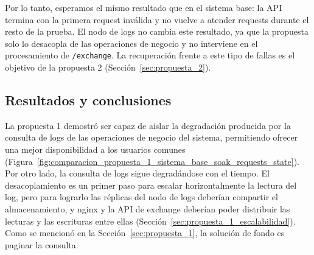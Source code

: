     Por lo tanto, esperamos el mismo resultado que en el sistema base: la API termina con la primera request inválida y no
    vuelve a atender requests durante el resto de la prueba. El nodo de logs no cambia este resultado, ya que la
    propuesta solo lo desacopla de las operaciones de negocio y no interviene en el procesamiento de \texttt{/exchange}.
    La recuperación frente a este tipo de fallas es el objetivo de la propuesta 2 (Sección~\ref{sec:propuesta_2}).

    \subsection{Resultados y conclusiones}
    \label{sec:propuesta_1_resultados_y_conclusiones}

    La propuesta 1 demostró ser capaz de aislar la degradación producida por la consulta de logs de las operaciones de negocio del sistema, permitiendo ofrecer una mejor disponibilidad a los usuarios comunes (Figura~\ref{fig:comparacion_propuesta_1_sistema_base_soak_requests_state}).
    Por otro lado, la consulta de logs sigue degradándose con el tiempo. El desacoplamiento es un primer paso para escalar
    horizontalmente la lectura del log, pero para lograrlo las réplicas del nodo de logs deberían compartir el almacenamiento,
    y nginx y la API de exchange deberían poder distribuir las lecturas y las escrituras entre ellas
    (Sección~\ref{sec:propuesta_1_escalabilidad}). Como se mencionó en la Sección~\ref{sec:propuesta_1}, la solución de fondo
    es paginar la consulta.
